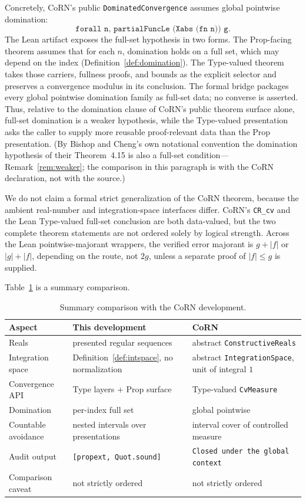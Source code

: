 \documentclass[11pt]{article}
\theoremstyle{definition}
\theoremstyle{remark}
\begin{document}
Concretely, CoRN's public \texttt{DominatedConvergence} assumes global pointwise domination:
\[
\texttt{forall n, partialFuncLe (Xabs (fn n)) g}.
\]
The Lean artifact exposes the full-set hypothesis in two forms.  The Prop-facing theorem assumes that for each \(n\), domination holds on a full set, which may depend on the index (Definition~\ref{def:domination}).  The Type-valued theorem takes those carriers, fullness proofs, and bounds as the explicit selector  and preserves a convergence modulus in its conclusion.  The formal bridge  packages every global pointwise domination family as full-set data; no converse is asserted.  Thus, relative to the domination clause of CoRN's public theorem surface alone, full-set domination is a weaker hypothesis, while the Type-valued presentation asks the caller to supply more reusable proof-relevant data than the Prop presentation.  (By Bishop and Cheng's own notational convention the domination hypothesis of their Theorem~4.15 is also a full-set condition---Remark~\ref{rem:weaker}; the comparison in this paragraph is with the CoRN declaration, not with the source.)

We do not claim a formal strict generalization of the CoRN theorem, because the ambient real-number and integration-space interfaces differ.  CoRN's \texttt{CR\_cv} and the Lean Type-valued full-set conclusion are both data-valued, but the two complete theorem statements are not ordered solely by logical strength.  Across the Lean pointwise-majorant wrappers, the verified error majorant is \(g+|f|\) or \(|g|+|f|\), depending on the route, not \(2g\), unless a separate proof of \(|f|\le g\) is supplied.

Table~\ref{tab:corn} is a summary comparison.

\begin{table}[htbp]
\centering\small
\caption{Summary comparison with the CoRN development.}
\label{tab:corn}
\setlength{\tabcolsep}{4pt}
\begin{tabular}{lll}
\hline
Aspect & This development & CoRN \\
\hline
Reals & presented regular sequences & abstract \texttt{ConstructiveReals} \\
Integration space & Definition~\ref{def:intspace}, no normalization & abstract \texttt{IntegrationSpace}, unit of integral $1$ \\
Convergence API & Type layers $+$ Prop surface & Type-valued \texttt{CvMeasure} \\
Domination & per-index full set & global pointwise \\
Countable avoidance & nested intervals over presentations & interval cover of controlled measure \\
Audit output & \texttt{[propext, Quot.sound]} & \texttt{Closed under the global context} \\
Comparison caveat & not strictly ordered & not strictly ordered \\
\hline
\end{tabular}
\end{table}
\end{document}
